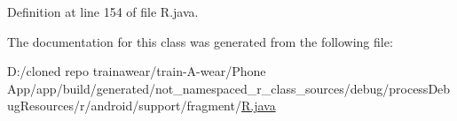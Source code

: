 Definition at line 154 of file R.\+java.



The documentation for this class was generated from the following file\+:\begin{DoxyCompactItemize}
\item 
D\+:/cloned repo trainawear/train-\/\+A-\/wear/\+Phone App/app/build/generated/not\+\_\+namespaced\+\_\+r\+\_\+class\+\_\+sources/debug/process\+Debug\+Resources/r/android/support/fragment/\mbox{\hyperlink{process_debug_resources_2r_2android_2support_2fragment_2_r_8java}{R.\+java}}\end{DoxyCompactItemize}
